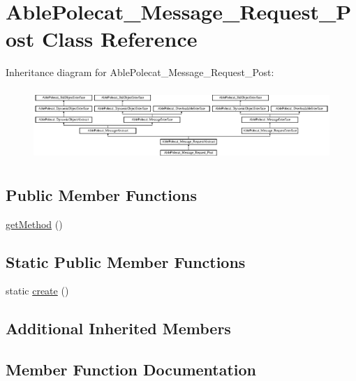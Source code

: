 \hypertarget{class_able_polecat___message___request___post}{}\section{Able\+Polecat\+\_\+\+Message\+\_\+\+Request\+\_\+\+Post Class Reference}
\label{class_able_polecat___message___request___post}
Inheritance diagram for Able\+Polecat\+\_\+\+Message\+\_\+\+Request\+\_\+\+Post\+:\begin{figure}[H]
\begin{center}
\leavevmode
\includegraphics[height=2.720648cm]{class_able_polecat___message___request___post}
\end{center}
\end{figure}
\subsection*{Public Member Functions}
\begin{DoxyCompactItemize}
\item 
\hyperlink{class_able_polecat___message___request___post_af3e37e1a6ed9b8c87f86f659873a83b7}{get\+Method} ()
\end{DoxyCompactItemize}
\subsection*{Static Public Member Functions}
\begin{DoxyCompactItemize}
\item 
static \hyperlink{class_able_polecat___message___request___post_a239b1c70258014a86569483c2d009de6}{create} ()
\end{DoxyCompactItemize}
\subsection*{Additional Inherited Members}


\subsection{Member Function Documentation}
\hypertarget{class_able_polecat___message___request___post_a239b1c70258014a86569483c2d009de6}{}
